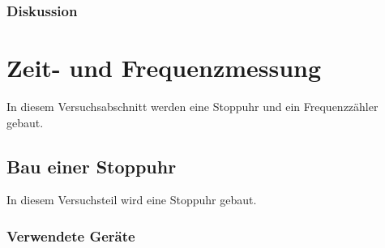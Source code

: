 \documentclass[12pt,a4paper]{article}
\begin{document}
\subsubsection*{Diskussion}




\section{Zeit- und Frequenzmessung}

In diesem Versuchsabschnitt werden eine Stoppuhr und ein Frequenzzähler gebaut.

\subsection{Bau einer Stoppuhr}

In diesem Versuchsteil wird eine Stoppuhr gebaut.

\subsubsection*{Verwendete Geräte}
\end{document}

